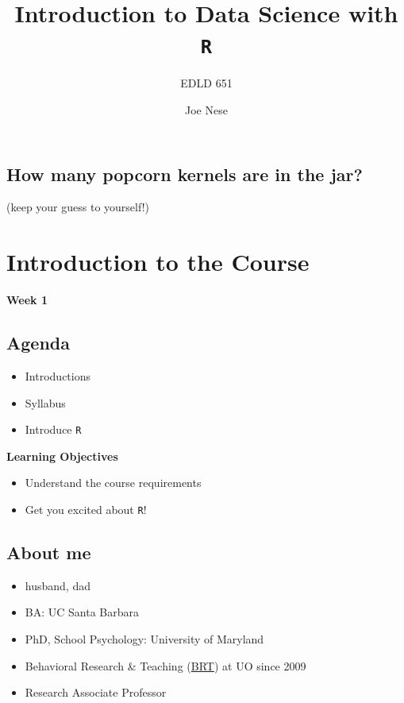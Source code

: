 \documentclass[
  letterpaper,
  DIV=11,
  numbers=noendperiod,
  oneside]{scrartcl}
\title{Introduction to Data Science with \texttt{R}}
\subtitle{EDLD 651}
\author{Joe Nese}
\date{}
\providecommand{\tightlist}{%
  \setlength{\itemsep}{0pt}\setlength{\parskip}{0pt}}\usepackage{longtable,booktabs,array}
\begin{document}
\maketitle
\ifdefined\Shaded\renewenvironment{Shaded}{\begin{tcolorbox}[frame hidden, boxrule=0pt, borderline west={3pt}{0pt}{shadecolor}, interior hidden, enhanced, sharp corners, breakable]}{\end{tcolorbox}}\fi

\hypertarget{how-many-popcorn-kernels-are-in-the-jar}{%
\subsection{How many popcorn kernels are in the
jar?}\label{how-many-popcorn-kernels-are-in-the-jar}}

(keep your guess to yourself!)

\hypertarget{introduction-to-the-course}{%
\section{Introduction to the Course}\label{introduction-to-the-course}}

\textbf{Week 1}

\hypertarget{agenda}{%
\subsection{Agenda}\label{agenda}}

\begin{itemize}
\tightlist
\item
  Introductions
\item
  Syllabus
\item
  Introduce \texttt{R}
\end{itemize}

\textbf{Learning Objectives}

\begin{itemize}
\tightlist
\item
  Understand the course requirements
\item
  Get you excited about \texttt{R}!
\end{itemize}

\hypertarget{about-me}{%
\subsection{About me}\label{about-me}}

\begin{itemize}
\tightlist
\item
  husband, dad
\item
  BA: UC Santa Barbara
\item
  PhD, School Psychology: University of Maryland
\item
  Behavioral Research \& Teaching (\href{http://brtprojects.org}{BRT})
  at UO since 2009
\item
  Research Associate Professor
\end{itemize}
\end{document}
